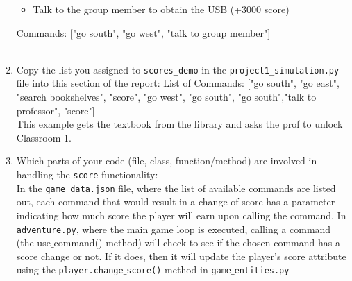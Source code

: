 \documentclass[11pt]{article}
\begin{document}
\begin{enumerate}
\begin{itemize}
            \item Talk to the group member to obtain the USB (+3000 score)
        \end{itemize}
Commands: ["go south", "go west", "talk to group member"]
\\\\
    \item Copy the list you assigned to \texttt{scores\_demo} in the \texttt{project1\_simulation.py} file into this section of the report:
List of Commands: ["go south", "go east", "search bookshelves", "score", "go west", "go south", "go south","talk to professor", "score"]\\
This example gets the textbook from the library and asks the prof to unlock Classroom 1.

    \item Which parts of your code (file, class, function/method) are involved in handling the \texttt{score} functionality:\\
        In the \texttt{game\_data.json} file, where the list of available commands are listed out, each command that would result in a change of score has a parameter indicating how much score the player will earn upon calling the command. In \texttt{adventure.py}, where the main game loop is executed, calling a command (the use$\_$command() method) will check to see if the chosen command has a score change or not. If it does, then it will update the player's score attribute using the \texttt{player.change$\_$score()} method in \texttt{game$\_$entities.py}
\end{enumerate}
\end{document}
